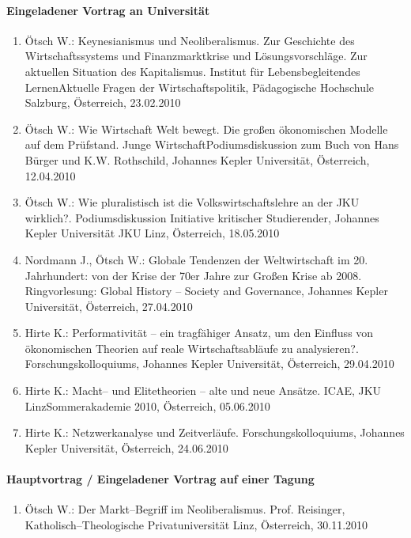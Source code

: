 \paragraph{Eingeladener Vortrag an Universität}
\begin{enumerate}
	\item Ötsch W.: Keynesianismus und Neoliberalismus. Zur Geschichte des Wirtschaftssystems und Finanzmarktkrise und Lösungsvorschläge. Zur aktuellen Situation des Kapitalismus. Institut für Lebensbegleitendes LernenAktuelle Fragen der Wirtschaftspolitik, Pädagogische Hochschule Salzburg, Österreich, 23.02.2010
	\item Ötsch W.: Wie Wirtschaft Welt bewegt. Die großen ökonomischen Modelle auf dem Prüfstand. Junge WirtschaftPodiumsdiskussion zum Buch von Hans Bürger und K.W. Rothschild, Johannes Kepler Universität, Österreich, 12.04.2010
	\item Ötsch W.: Wie pluralistisch ist die Volkswirtschaftslehre an der JKU wirklich?. Podiumsdiskussion Initiative kritischer Studierender, Johannes Kepler Universität JKU Linz, Österreich, 18.05.2010
	\item Nordmann J., Ötsch W.: Globale Tendenzen der Weltwirtschaft im 20. Jahrhundert: von der Krise der 70er Jahre zur Großen Krise ab 2008. Ringvorlesung: Global History -- Society and Governance, Johannes Kepler Universität, Österreich, 27.04.2010
	\item Hirte K.: Performativität -- ein tragfähiger Ansatz, um den Einfluss von ökonomischen Theorien auf reale Wirtschaftsabläufe zu analysieren?. Forschungskolloquiums, Johannes Kepler Universität, Österreich, 29.04.2010
	\item Hirte K.: Macht-- und Elitetheorien – alte und neue Ansätze. ICAE, JKU LinzSommerakademie 2010, Österreich, 05.06.2010
	\item Hirte K.: Netzwerkanalyse und Zeitverläufe. Forschungskolloquiums, Johannes Kepler Universität, Österreich, 24.06.2010
\end{enumerate}
\paragraph{Hauptvortrag / Eingeladener Vortrag auf einer Tagung}
\begin{enumerate}
	\item Ötsch W.: Der Markt--Begriff im Neoliberalismus. Prof. Reisinger, Katholisch--Theologische Privatuniversität Linz, Österreich, 30.11.2010
\end{enumerate}
